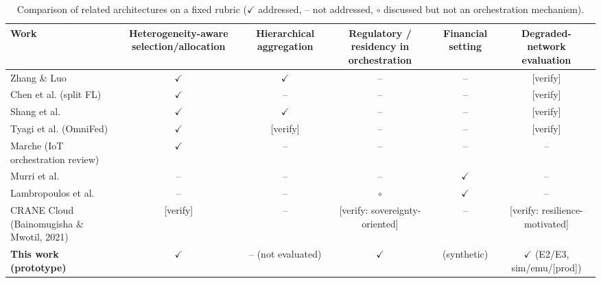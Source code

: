 \begin{table}[t]\centering\footnotesize
\caption{Comparison of related architectures on a fixed rubric ($\checkmark$ addressed, -- not addressed, $\circ$ discussed but not an orchestration mechanism).}\label{tab:related}
\begin{tabular}{lccccc}\toprule
Work & Heterogeneity-aware selection/allocation & Hierarchical aggregation & Regulatory / residency in orchestration & Financial setting & Degraded-network evaluation\\\midrule
Zhang \& Luo & $\checkmark$ & $\checkmark$ & -- & -- & [verify]\\
Chen et al. (split FL) & $\checkmark$ & -- & -- & -- & [verify]\\
Shang et al. & $\checkmark$ & $\checkmark$ & -- & -- & [verify]\\
Tyagi et al. (OmniFed) & $\checkmark$ & [verify] & -- & -- & [verify]\\
Marche (IoT orchestration review) & $\checkmark$ & -- & -- & -- & --\\
Murri et al. & -- & -- & -- & $\checkmark$ & --\\
Lambropoulos et al. & -- & -- & $\circ$ & $\checkmark$ & --\\
CRANE Cloud (Bainomugisha \& Mwotil, 2021) & [verify] & -- & [verify: sovereignty-oriented] & -- & [verify: resilience-motivated]\\\midrule
\textbf{This work (prototype)} & $\checkmark$ & -- (not evaluated) & $\checkmark$ & (synthetic) & $\checkmark$ (E2/E3, sim/emu/[prod])\\\bottomrule
\end{tabular}\end{table}
